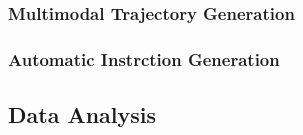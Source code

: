\subsubsection{Multimodal Trajectory Generation}

\subsubsection{Automatic Instrction Generation}


\subsection{Data Analysis}